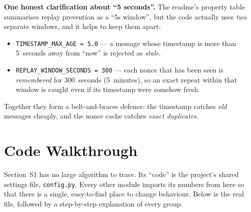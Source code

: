 \documentclass[11pt,a4paper]{article}
\begin{document}
\textbf{One honest clarification about ``5 seconds''.} The readme's property
table summarises replay prevention as a ``5s window'', but the code actually
uses \emph{two} separate windows, and it helps to keep them apart:
\begin{itemize}
  \item \texttt{TIMESTAMP\_MAX\_AGE = 5.0} --- a message whose timestamp is more
        than 5~seconds away from ``now'' is rejected as \emph{stale}.
  \item \texttt{REPLAY\_WINDOW\_SECONDS = 300} --- each nonce that has been seen
        is \emph{remembered} for 300~seconds (5~minutes), so an exact repeat
        within that window is caught even if its timestamp were somehow fresh.
\end{itemize}
Together they form a belt-and-braces defence: the timestamp catches \emph{old}
messages cheaply, and the nonce cache catches \emph{exact duplicates}.

\section{Code Walkthrough}

Section~S1 has no large algorithm to trace. Its ``code'' is the project's
shared settings file, \texttt{config.py}. Every other module imports its numbers
from here so that there is a single, easy-to-find place to change behaviour.
Below is the real file, followed by a step-by-step explanation of every group.
\end{document}
